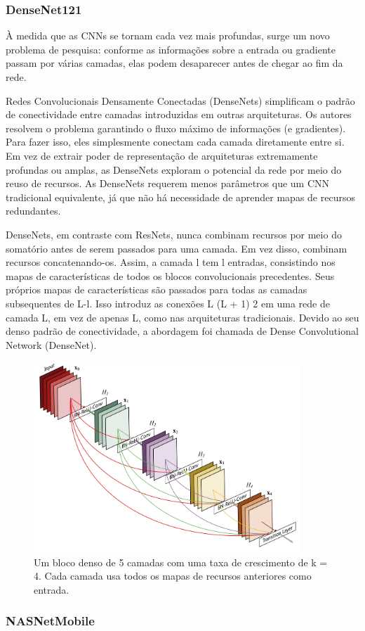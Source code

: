 \subsubsection{DenseNet121}

À medida que as CNNs se tornam cada vez mais profundas, surge um novo problema de pesquisa: conforme as informações sobre a entrada ou gradiente passam por várias camadas, elas podem desaparecer antes de chegar ao fim da rede.


Redes Convolucionais Densamente Conectadas (DenseNets) simplificam o padrão de conectividade entre camadas introduzidas em outras arquiteturas. Os autores resolvem o problema garantindo o fluxo máximo de informações (e gradientes). Para fazer isso, eles simplesmente conectam cada camada diretamente entre si. Em vez de extrair poder de representação de arquiteturas extremamente profundas ou amplas, as DenseNets exploram o potencial da rede por meio do reuso de recursos. As DenseNets requerem menos parâmetros que um CNN tradicional equivalente, já que não há necessidade de aprender mapas de recursos redundantes.

DenseNets, em contraste com ResNets, nunca combinam recursos por meio do somatório antes de serem passados para uma camada. Em vez disso, combinam recursos concatenando-os.
Assim, a camada l tem l entradas, consistindo nos mapas de características de todos os blocos convolucionais precedentes. Seus próprios mapas de características são passados para todas as camadas subsequentes de L-l. Isso introduz as conexões L (L + 1) 2 em uma rede de camada L, em vez de apenas L, como nas arquiteturas tradicionais. Devido ao seu denso padrão de conectividade, a abordagem foi chamada de Dense Convolutional Network (DenseNet).

\begin{figure}[!ht]
\centering 
\caption{Um bloco denso de 5 camadas com uma taxa de crescimento de k = 4. Cada camada usa todos os mapas de recursos anteriores como entrada.}
\label{fig:densenet}
\includegraphics[width=0.9\textwidth]{imgs/densenets.jpg}
\end{figure}

\subsubsection{NASNetMobile}

